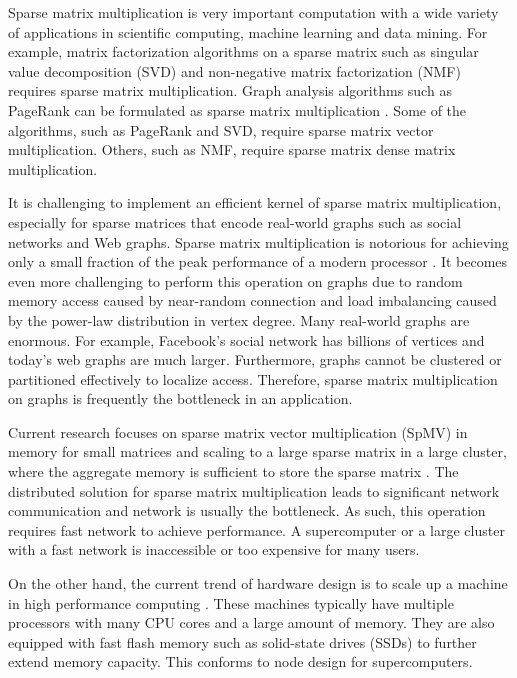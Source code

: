 Sparse matrix multiplication is very important computation with a wide variety
of applications in scientific computing, machine learning and data mining.
For example, matrix factorization algorithms on a sparse matrix such as
singular value decomposition (SVD) \cite{svd} and non-negative matrix
factorization (NMF) \cite{nmf} requires sparse matrix multiplication.
Graph analysis algorithms such as PageRank \cite{pagerank} can be
formulated as sparse matrix multiplication \cite{Mattson13}. Some of
the algorithms, such as PageRank and SVD, require sparse matrix vector
multiplication. Others, such as NMF, require sparse matrix dense
matrix multiplication.


It is challenging to implement an efficient kernel of sparse matrix
multiplication, especially for sparse matrices that encode real-world graphs
such as social networks
and Web graphs. Sparse matrix multiplication is notorious for achieving only
a small fraction of the peak performance of a modern processor \cite{Williams07}.
It becomes even more challenging to perform this operation on graphs due to
random memory access caused by near-random connection and load imbalancing
caused by the power-law distribution in vertex degree. Many real-world graphs
are enormous. For example, Facebook's social network has billions of vertices
and today's web graphs are much larger. Furthermore, graphs cannot be
clustered or partitioned effectively \cite{leskovec} to localize access.
Therefore, sparse matrix multiplication on graphs is frequently the bottleneck
in an application.

Current research focuses on sparse matrix vector multiplication (SpMV) in memory
for small matrices and scaling to a large sparse matrix in a large cluster,
where the aggregate memory is sufficient to store the sparse matrix
\cite{Williams07, Yoo11, Boman2013}.
The distributed solution for sparse matrix multiplication leads to significant
network communication and network is usually the bottleneck.
As such, this operation requires fast network to achieve performance.
A supercomputer or a large cluster with a fast network is inaccessible or
too expensive for many users.



On the other hand, the current trend of hardware design is to scale up
a machine in high performance computing \cite{Ang14}.
These machines typically have multiple processors with many CPU cores and
a large amount of memory. They are also equipped with fast flash
memory such as solid-state drives (SSDs) to further extend memory capacity.
This conforms to node design for supercomputers.


